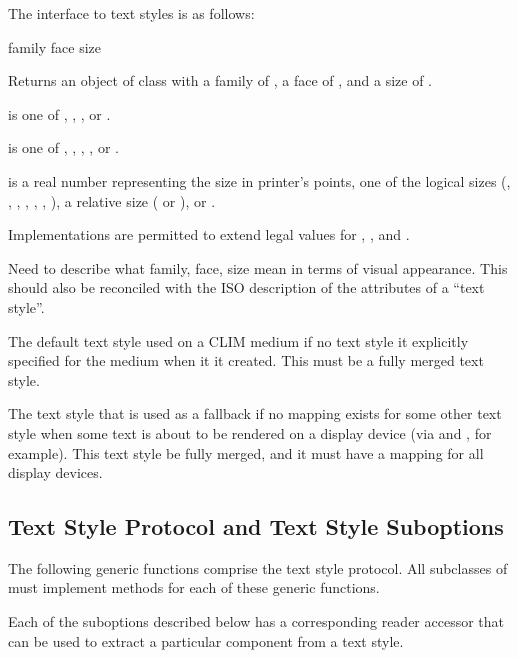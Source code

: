 The interface to text styles is as follows:

 {family face size}

Returns an object of class  with a family of
, a face of , and a size of .

 is one of , , , or .

 is one of , , , ,
or .

 is a real number representing the size in printer's points, one of
the logical sizes (, , , ,
, , ), a relative size ( or
), or .

Implementations are permitted to extend legal values for ,
, and .

 {Need to describe what family, face, size mean in terms of
visual appearance.  This should also be reconciled with the ISO description of
the attributes of a ``text style''.}


The default text style used on a CLIM medium if no text style it explicitly
specified for the medium when it it created.  This must be a fully merged text
style.


The text style that is used as a fallback if no mapping exists for some other
text style when some text is about to be rendered on a display device (via
 and , for example).  This text style be fully
merged, and it must have a mapping for all display devices.


\subsection {Text Style Protocol and Text Style Suboptions}

The following generic functions comprise the text style protocol.  All
subclasses of  must implement methods for each of these generic
functions.

Each of the suboptions described below has a corresponding reader accessor that
can be used to extract a particular component from a text style.

